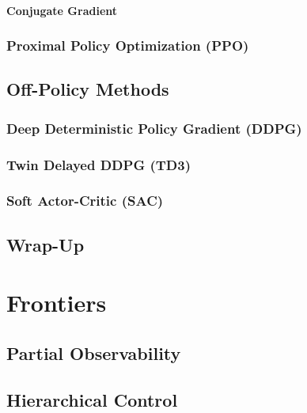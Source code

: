 			\subsubsection{Conjugate Gradient} %

		\subsection{Proximal Policy Optimization (PPO)} %

	\section{Off-Policy Methods} %

		\subsection{Deep Deterministic Policy Gradient (DDPG)} %

		\subsection{Twin Delayed DDPG (TD3)} %

		\subsection{Soft Actor-Critic (SAC)} %

	\section{Wrap-Up} %

\chapter{Frontiers} %

	\section{Partial Observability} %

	\section{Hierarchical Control} %

